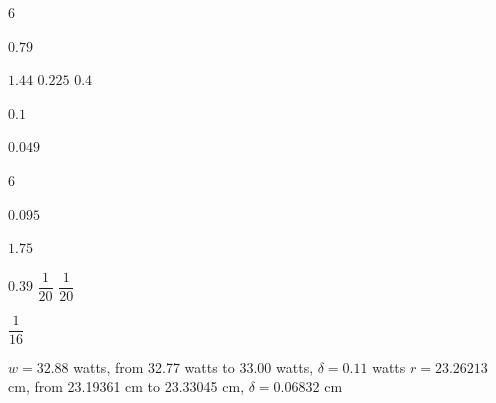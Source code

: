 \documentclass{book}
\begin{document}
\begin{appendices}
\rebootHW
\begin{enumerate}[!HW!]
\begin{multicols}{6}
\item $0.79$
\item  $1.44$
\itemspade  $0.225$
\itemspade  $0.4$
\item  $0.1$
\item $0.049$
\end{multicols}
\begin{multicols}{6}
\item $0.095$
\item $1.75$
\item $0.39$
\itemspade $\dfrac{1}{20}$
\itemspade $\dfrac{1}{20}$
\item $\dfrac{1}{16}$
\end{multicols}

\itemspade $w = 32.88$ watts, from 32.77 watts to 33.00 watts, $\delta = 0.11$ watts
\itemspade $r = 23.26213$ cm, from 23.19361 cm to 23.33045 cm, $\delta = 0.06832$ cm 
\end{enumerate}
\vspace{-15 pt}


\end{appendices}
\end{document}
